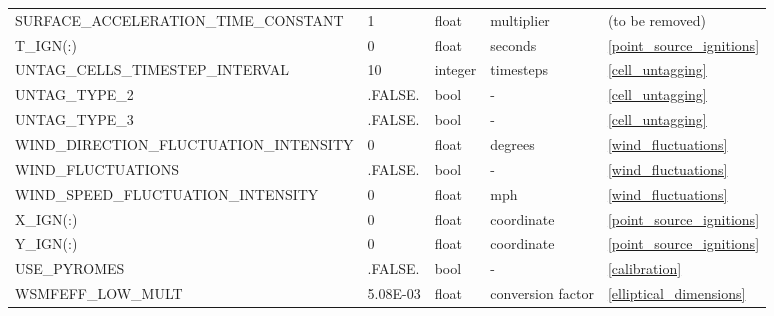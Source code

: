 \begin{landscape}
\begin{center}
\begin{longtable}{lllll}
SURFACE\_ACCELERATION\_TIME\_CONSTANT        & 1                          & float                  & multiplier                         & (to be removed)                      \\
T\_IGN(:)                                    & 0                          & float                  & seconds                            & \ref{point_source_ignitions}         \\
UNTAG\_CELLS\_TIMESTEP\_INTERVAL             & 10                         & integer                & timesteps                          & \ref{cell_untagging}                 \\
UNTAG\_TYPE\_2                               & .FALSE.                    & bool                   & -                                  & \ref{cell_untagging}                 \\
UNTAG\_TYPE\_3                               & .FALSE.                    & bool                   & -                                  & \ref{cell_untagging}                 \\
WIND\_DIRECTION\_FLUCTUATION\_INTENSITY      & 0                          & float                  & degrees                            & \ref{wind_fluctuations}              \\
WIND\_FLUCTUATIONS                           & .FALSE.                    & bool                   & -                                  & \ref{wind_fluctuations}              \\
WIND\_SPEED\_FLUCTUATION\_INTENSITY          & 0                          & float                  & mph                                & \ref{wind_fluctuations}              \\
X\_IGN(:)                                    & 0                          & float                  & coordinate                         & \ref{point_source_ignitions}         \\
Y\_IGN(:)                                    & 0                          & float                  & coordinate                         & \ref{point_source_ignitions}         \\
USE\_PYROMES                                 & .FALSE.                    & bool                   & -                                  & \ref{calibration}                    \\
WSMFEFF\_LOW\_MULT                           & 5.08E-03                   & float                  & conversion factor                  & \ref{elliptical_dimensions}          \\

\end{longtable}
\end{center}
\end{landscape}
